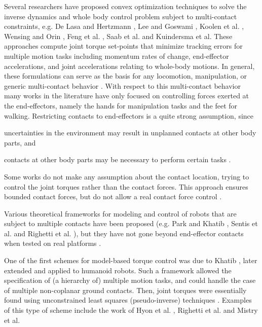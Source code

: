 	Several researchers have proposed convex optimization techniques to solve the inverse dynamics and
	whole body control problem subject to multi-contact constraints, e.g. De Lasa and Hertzmann
	\cite{DeLasa_IROS2009}, Lee and Goswami \cite{LeeS_IROS2010}, Koolen et al. \cite{Koolen_Humanoids2013},
	Wensing and Orin \cite{Wensing_ICRA2013}, Feng et al. \cite{Feng_Humanoids2014}, Saab et al.
	\cite{Saab_TransRobotics2013} and Kuindersma et al. \cite{Kuindersma_ICRA2014}
	These approaches compute joint torque set-points that minimize tracking errors for multiple motion
	tasks including momentum rates of change, end-effector accelerations, and joint accelerations relating
	to whole-body motions.
	In general, these formulations can serve as the basis for any locomotion, manipulation, or generic
	multi-contact behavior \cite{Hopkins_ICRA2015}.
	With respect to this multi-contact behavior many works in the literature have only focused on
	controlling forces exerted at the	end-effectors, namely the hands for manipulation tasks and
	the feet for walking.
	Restricting contacts to end-effectors is a quite strong assumption, since
	\begin{inparaenum}
		\item uncertainties in the environment may result in unplanned contacts at other body parts,
					and
		\item contacts at other body parts may be necessary to perform certain tasks
					\cite{DelPrete_PhDThesis2013}.
	\end{inparaenum}
	
	Some works do not make any assumption about the contact location, trying to control the joint
	torques	rather than the contact forces.
	This approach ensures bounded contact forces, but do not allow a real contact force control
	\cite{DelPrete_PhDThesis2013}.
	
	Various theoretical frameworks for modeling and control of robots that are subject to multiple
	contacts have been proposed (e.g. Park and Khatib \cite{Park_ICRA2006}, Sentis et al.
	\cite{Sentis_IROS2009} and Righetti et al. \cite{Righetti_ICRA2011}), but they have not
	gone beyond end-effector contacts when tested	on real platforms \cite{DelPrete_PhDThesis2013}.

	One of the first schemes for model-based torque control was due to Khatib
	\cite{Khatib_RoboticsAuto1987}, later extended and applied to humanoid robots.
	Such a framework allowed the specification of (a hierarchy of) multiple motion tasks,
	and could handle the case of multiple non-coplanar ground contacts.
	Then, joint torques were essentially found using unconstrained least squares (pseudo-inverse) techniques
	\cite{DelPrete_PhDThesis2013}.
	Examples of this type of scheme include the work of Hyon et al. \cite{Hyon_TransRobotics2007},
	Righetti et al. \cite{Righetti_CLAWAR2010} and Mistry et al. \cite{Mistry_ICRA2010}
	
